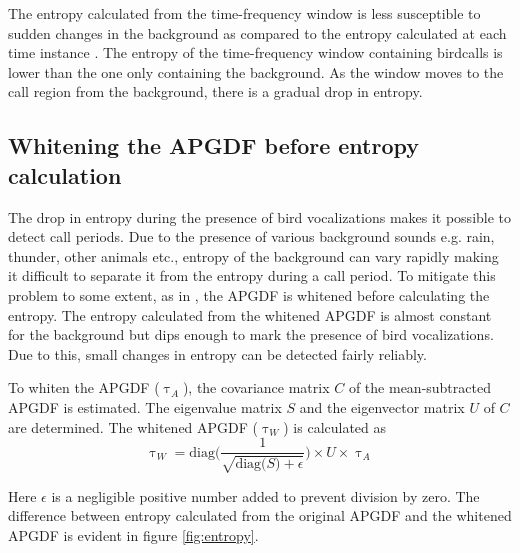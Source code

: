 \documentclass[a4paper]{article}
\begin{document}
The entropy calculated from the time-frequency window is less susceptible to sudden
changes in the background as compared to the entropy calculated at each time
instance \cite{wang2013}. The entropy of the time-frequency window containing
birdcalls is lower than the one only containing the background. As the
window moves to the call region from the background, there is a gradual drop in
entropy. 



\subsection{Whitening the APGDF before entropy calculation}

The drop in entropy during the presence of bird vocalizations makes it possible
to detect call periods. Due to the presence of various background sounds e.g.
rain, thunder, other animals etc., entropy of the background can  vary rapidly
making it difficult to separate it from the entropy during a call period. To
mitigate this problem to some extent, as in \cite{wang2013}, the APGDF is
whitened before calculating the entropy. The entropy calculated from the
whitened APGDF is almost constant for the background but dips enough to mark the
presence of bird vocalizations. Due to this, small changes in entropy can be
detected fairly reliably. 

To whiten the APGDF ($\uptau_A$), the covariance matrix $C$ of the mean-subtracted
APGDF is estimated. The eigenvalue matrix $S$ and the eigenvector matrix
$U$ of $C$ are determined. The whitened APGDF
($\uptau_W$) is calculated as
\begin{equation}
\label{eq:4}
\uptau_W=\text{diag} \bigg(  \frac{1}{\sqrt{\text{diag($S$)}+\epsilon}} 
\bigg )\times \text{$U$} \times \uptau_A
\end{equation}

Here $\epsilon$ is a negligible positive number added to prevent division by
zero.  The difference between entropy calculated from the original APGDF and the
whitened APGDF is evident in figure \ref{fig:entropy}.
\end{document}
